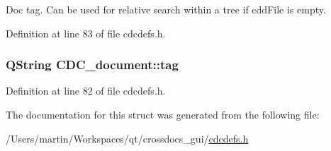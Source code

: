 Doc tag. Can be used for relative search within a tree if cdd\+File is empty. 



Definition at line 83 of file cdcdefs.\+h.

\hypertarget{struct_c_d_c__document_a99da5d8aeec9a1b01a71cb01101aeffd}{
\subsubsection[{tag}]{\setlength{\rightskip}{0pt plus 5cm}Q\+String C\+D\+C\+\_\+document\+::tag}}\label{struct_c_d_c__document_a99da5d8aeec9a1b01a71cb01101aeffd}


Definition at line 82 of file cdcdefs.\+h.



The documentation for this struct was generated from the following file\+:\begin{DoxyCompactItemize}
\item 
/\+Users/martin/\+Workspaces/qt/crossdocs\+\_\+gui/\hyperlink{cdcdefs_8h}{cdcdefs.\+h}\end{DoxyCompactItemize}
